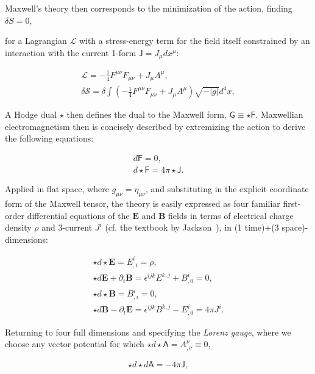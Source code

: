 \noindent Maxwell's theory then corresponds to the minimization of the action, finding $\delta S = 0$,


\noindent for a Lagrangian $\mathcal{L}$ with a stress-energy term for the field itself constrained by an interaction with the current 1-form $\textsf{J} = J_\mu d x^\mu$:

\begin{eqnarray}
\mathcal{L} = - \frac{1}{4} F^{\mu \nu} F_{\mu \nu} + J_\mu A^\mu,\\ 
\delta \mathcal{S} = \delta \int \left( -\frac{1}{4} F^{\mu \nu} F_{\mu \nu} + J_\mu A^\mu \right) \sqrt{-|g|}d^4 x,
\end{eqnarray}

A Hodge dual $\star$ then defines the dual to the Maxwell form, $\textsf{G} \equiv \star \textsf{F}$. 
Maxwellian electromagnetism then is concisely described by extremizing the action to derive the following equations:

\begin{eqnarray}
d \textsf{F} = 0,\\
d \star \textsf{F} = 4 \pi \star \textsf{J}.
\end{eqnarray}  

Applied in flat space, where $g_{\mu \nu} = \eta_{\mu \nu}$, and substituting in the explicit coordinate form of the Maxwell tensor, the theory is easily expressed as four familiar first-order differential equations of the $\textbf{E}$ and $\textbf{B}$ fields in terms of electrical charge density $\rho$ and 3-current $J^i$ (cf. the textbook by Jackson~\cite{JacksonEM}), in (1 time)+(3 space)-dimensions:
 

\begin{eqnarray}
\star d \star \textbf{E} = E^i_{,i} = \rho,\\
\star d \textbf{E} + \partial_t \textbf{B} = \epsilon^{ijk} E^{k,j} + B^i_{,0} = 0,\\
\star d \star \textbf{B} = B^i_{,i} = 0,\\
\star d \textbf{B} - \partial_t \textbf{E} = \epsilon^{ijk} B^{k,j} - E^i_{,0} = 4 \pi J^i.
\end{eqnarray}

Returning to four full dimensions and specifying the \textit{Lorenz gauge}, where we choose any vector potential for which $\star d \star \textsf{A} = A^\nu_{,\nu} \equiv 0$, 

\begin{eqnarray}
\star d \star d \textsf{A} = -4\pi \textsf{J},
\end{eqnarray}
        

